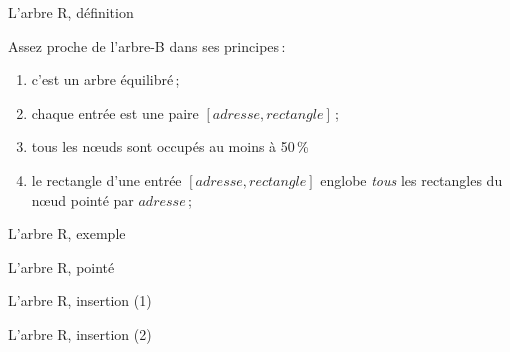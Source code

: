 \begin{frame}{L'arbre R, définition}

Assez proche de l'arbre-B dans ses principes\,:

\begin{enumerate}
  \item c'est un arbre équilibré\,;
  \item chaque entrée est une paire $[adresse, rectangle]$\,;
  \item tous les n{\oe}uds sont occupés au moins à 50\,\%
  \item le rectangle d'une entrée  $[adresse, rectangle]$
          englobe {\em tous} les rectangles du n{\oe}ud
           pointé par $adresse$\,;
\end{enumerate}


\end{frame}
\begin{frame}{L'arbre R, exemple}




\end{frame}
\begin{frame}{L'arbre R, pointé}




\end{frame}
\begin{frame}{L'arbre R, insertion (1)}




\end{frame}
\begin{frame}{L'arbre R, insertion (2)}




\end{frame}
